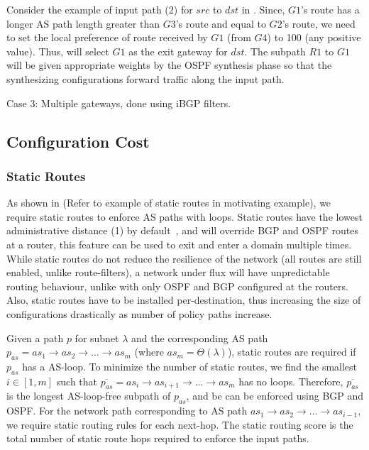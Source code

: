 Consider the example of input path (2) for $src$ to $dst$ 
in . Since, $G1$'s route has a longer AS 
path length greater than $G3$'s route and equal to $G2$'s route,
we need to set the local preference of route received by $G1$ 
(from $G4$) to 100 (any positive value). Thus,  
will select $G1$ as the exit gateway for $dst$. The subpath
$R1$ to $G1$ will be given appropriate weights by the OSPF
synthesis phase so that the synthesizing configurations 
forward traffic along the input path. 

Case 3: Multiple gateways, done using iBGP filters. 

\subsection{Configuration Cost}
\subsubsection{Static Routes} \label{sec:static}
As shown in \Cref{} (Refer to example of 
static routes in motivating example), we require static routes 
to enforce AS paths with loops. Static routes have the lowest 
administrative distance (1) by default~\cite{ad}, and will override BGP
and OSPF routes at a router, this feature can be used to 
exit and enter a domain multiple times. While static routes
do not reduce the resilience of the network (all routes are still
enabled, unlike route-filters), a network under flux will have
unpredictable routing behaviour, unlike with only OSPF and BGP
configured at the routers. 
Also, static routes have to be installed per-destination, thus increasing
the size of configurations drastically as number of policy paths increase.

Given a path $p$ for subnet $\lambda$ and 
the corresponding AS path $p_{as}
= as_1 \rightarrow as_2 \rightarrow \ldots \rightarrow as_m$ (where
$as_m = \Theta(\lambda)$), static
routes are required if $p_{as}$ has a AS-loop. 
To minimize
the number of static routes, we find 
the smallest $i \in [1,m]$ 
such that $\overline{p_{as}} = as_i \rightarrow as_{i+1}
\rightarrow \ldots \rightarrow as_m$ has no loops. 
Therefore, $\overline{p_{as}}$ is the longest AS-loop-free
subpath of $p_{as}$, and be can be enforced using BGP and OSPF. For the 
network path corresponding to AS path $as_1 \rightarrow as_2 
\rightarrow \ldots \rightarrow as_{i-1}$, we require static
routing rules for each next-hop. The static routing score
is the total number of static route hops required to enforce
the input paths.

